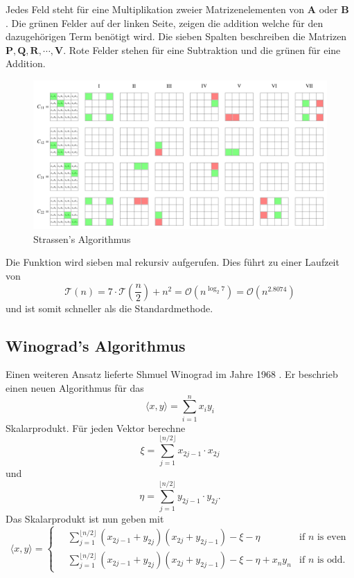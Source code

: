 Jedes Feld steht f\"ur eine Multiplikation zweier Matrizenelementen von $\mathbf{A}$ oder $\mathbf{B}$ . 
Die gr\"unen Felder auf der linken Seite, zeigen die addition welche f\"ur den dazugeh\"origen Term ben\"otigt wird.
Die sieben Spalten beschreiben die Matrizen $\mathbf{P,Q,R, \dotsb, V}$.
Rote Felder stehen f\"ur eine Subtraktion und die gr\"unen f\"ur eine Addition.  
\begin{figure}
	\center
	\includegraphics[width=\linewidth]{papers/multiplikation/images/strassen.pdf}
	\caption{Strassen's Algorithmus}
	\label{multiplikation:fig:strassen}
\end{figure}

Die Funktion wird sieben mal rekursiv aufgerufen.
Dies f\"uhrt zu einer Laufzeit von
\begin{equation} \label{multiplikation:eq:laufzeitstrassen}
\mathcal{T}(n) =
7 \cdot \mathcal{T}(\frac{n}{2}) + n^2  = \mathcal{O}\left(n^{\log_2 7}\right ) = \mathcal{O}\left(n^{2.8074} \right )
\end{equation}
und ist somit schneller als die Standardmethode.

\subsection{Winograd's Algorithmus}

Einen weiteren Ansatz lieferte Shmuel Winograd im Jahre 1968 \cite{multiplikation:winograd_1968}.
Er beschrieb einen neuen Algorithmus f\"ur das
\begin{equation}
	\langle x,y \rangle = \sum_{i=1}^{n}x_i y_i
\end{equation}
Skalarprodukt.
F\"ur jeden Vektor berechne
\begin{equation}
	\xi = \sum_{j=1}^{ \lfloor n/2 \rfloor} x_{2j-1} \cdot x_{2j}
\end{equation}
und
\begin{equation}
	\eta = \sum_{j=1}^{ \lfloor n/2 \rfloor} y_{2j-1} \cdot y_{2j}.
\end{equation}
Das Skalarprodukt ist nun geben mit
\begin{equation}
	\langle x,y \rangle =
	\begin{cases}
	 \displaystyle \quad \sum_{j=1}^{ \lfloor n/2 \rfloor} (x_{2j-1} + y_{2j})(x_{2j}+y_{2j-1})-\xi - \eta & \text{if  $n$ is even}\\
	\displaystyle  \quad \sum_{j=1}^{ \lfloor n/2 \rfloor} (x_{2j-1} + y_{2j})(x_{2j}+y_{2j-1})-\xi - \eta + x_n y_n & \text{if  $n$ is odd}.
	\end{cases}
\end{equation}

